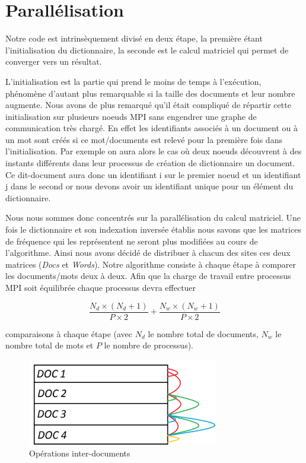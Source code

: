 \section{Parallélisation}

Notre code est intrinsèquement divisé en deux étape,
la première étant l'initialisation du dictionnaire,
la seconde est le calcul matriciel qui permet de
converger vers un résultat.

L'initialisation est la partie qui prend le moins
de temps à l'exécution,
phénomène d'autant plus remarquable si la taille des
documents et leur nombre augmente.
Nous avons de plus remarqué qu'il était compliqué de répartir
cette initialisation sur plusieurs noeuds MPI sans
engendrer une graphe de communication très chargé.
En effet les identifiants associés à un document
ou à un mot sont créés si ce mot/documents est relevé
pour la première fois dans l'initialisation.
Par exemple on aura alors le cas où deux noeuds
découvrent à des instants différents dans leur processus
de création de dictionnaire un document.
Ce dit-document aura donc un identifiant i sur
le premier noeud et un identifiant j dans le second
or nous devons avoir un identifiant unique pour
un élément du dictionnaire.

Nous nous sommes donc concentrés sur la parallélisation
du calcul matriciel.
Une fois le dictionnaire et son indexation inversée
établis nous savons que les matrices de fréquence qui les
représentent ne seront plus modifiées au cours de l'algorithme.
Ainsi nous avons décidé de distribuer à chacun des sites
ces deux matrices ({\it Docs} et {\it Words}).
Notre algorithme consiste à chaque étape à comparer
les documents/mots deux à deux.
Afin que la charge de travail entre processus MPI soit
équilibrée chaque processus devra effectuer

\[ \frac{N_d \times (N_d+1)}{P \times 2}
 + \frac{N_w \times (N_w+1)}{P \times 2} \]

comparaisons à chaque étape
(avec $N_d$ le nombre total de documents, $N_w$ le nombre total de mots et $P$ le nombre de processus).

\begin{figure}[h]
\begin{center}
\includegraphics[height=1.5in]{cr/1}
\caption{Opérations inter-documents}
\end{center}
\end{figure}

